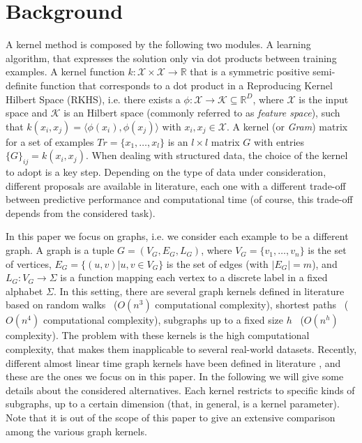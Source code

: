\documentclass{esannV2}
\newcommand{\1}{{\bf 1}}
\begin{document}
\section{Background}
A kernel method is composed by the following two modules.
A learning algorithm, that expresses the solution only via dot products between training examples.
A kernel function ${k}: \mathcal{X} \times \mathcal{X} \rightarrow \mathbb{R}$ that is a symmetric positive semi-definite function that corresponds to a dot product in a Reproducing Kernel Hilbert Space (RKHS), i.e. there exists a $\phi: \mathcal{X} \rightarrow \mathcal{K} \subseteq \mathbb{R}^D$, where $\mathcal{X}$ is the input space and $\mathcal{K}$ is an Hilbert space (commonly referred to as \textit{feature space}), such that $k(x_i,x_j) = \langle \phi(x_i),\phi(x_j) \rangle$ with $x_i,x_j \in \mathcal{X}$. %
A kernel (or \textit{Gram}) matrix for a set of examples $Tr=\{x_1, \ldots, x_l\}$ is an $l \times l$ matrix $G$ with entries $\{G\}_{ij}=k(x_i,x_j)$.
When dealing with structured data, the choice of the kernel to adopt is a key step. Depending on the type of data under consideration, different proposals are available in literature, each one with a different trade-off between predictive performance and computational time (of course, this trade-off depends from the considered task).

In this paper we focus on graphs, i.e. we consider each example to be a different graph.
A graph is a tuple $G=(V_G,E_G,L_G)$, where $V_G=\{v_1,\ldots,v_n\}$ is the set of vertices, $E_G=\{(u,v) | u,v \in V_G\}$ is the set of edges (with $|E_G|=m$), and $L_G: V_G \rightarrow \Sigma$ is a function mapping each vertex to a discrete label in a fixed alphabet $\Sigma$.
In this setting, there are several graph kernels defined in literature based on random walks~\cite{Kashima03marginalizedkernels,Mahe2004} ($O(n^3)$ computational complexity), shortest paths~\cite{Kriegel05shortestpath} ($O(n^4)$ computational complexity), subgraphs up to a fixed size $h$~\cite{Shervashidze2009} ($O(n^h)$ complexity). The problem with these kernels is the high computational complexity, that makes them inapplicable to several real-world datasets.
Recently, different almost linear time graph kernels have been defined in literature \cite{Heinonen2009,NIPS2009_0533,Costa2010,Shervashidze2011,Dasan2012,DaSanMartino2016}, and these are the ones we focus on in this paper.
In the following we will give some details about the considered alternatives.
Each kernel restricts to specific kinds of subgraphs, up to a certain dimension (that, in general, is a kernel parameter).
Note that it is out of the scope of this paper to give an extensive comparison among the various graph kernels. 
\end{document}

